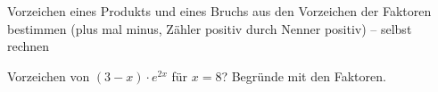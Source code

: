 \begin{aufgabe}{Vorzeichen eines Produkts und eines Bruchs aus den Vorzeichen der Faktoren bestimmen (plus mal minus, Zähler positiv durch Nenner positiv) – selbst rechnen}
\begin{teile}
\teil Vorzeichen von $(3 - x) \cdot e^{2x}$ für $x = 8$? Begründe mit den Faktoren.
\end{teile}
\end{aufgabe}
